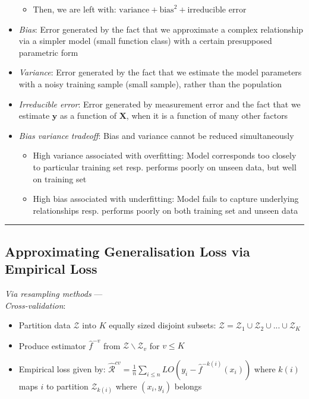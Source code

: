 \begin{itemize}
\begin{itemize}
\begin{itemize}
        \end{itemize}
        \item Then, we are left with: $\textrm{variance} + \textrm{bias}^2 + \textrm{irreducible error}$
    \end{itemize}
    \item \emph{Bias}: Error generated by the fact that we approximate a complex relationship via a simpler model (small function class) with a certain presupposed parametric form
    \item \emph{Variance}: Error generated by the fact that we estimate the model parameters with a noisy training sample (small sample), rather than the population
    \item \emph{Irreducible error}: Error generated by measurement error and the fact that we estimate $\boldsymbol{y}$ as a function of $\boldsymbol{X}$, when it is a function of many other factors
    \item \emph{Bias variance tradeoff}: Bias and variance cannot be reduced simultaneously
    \begin{itemize}
        \item High variance associated with overfitting: Model corresponds too closely to particular training set resp. performs poorly on unseen data, but well on training set 
        \item High bias associated with underfitting: Model fails to capture underlying relationships resp. performs poorly on both training set and unseen data
    \end{itemize}    
\end{itemize}

{\color{black}\hrule height 0.001mm}

\subsection*{Approximating Generalisation Loss via Empirical Loss}
\emph{Via resampling methods} --- \\
\emph{Cross-validation}:
\begin{itemize}
    \item Partition data $\mathcal{Z}$ into $K$ equally sized disjoint subsets: $\mathcal{Z} = \mathcal{Z}_1 \cup \mathcal{Z}_2 \cup ... \cup \mathcal{Z}_K$
    \item Produce estimator $\hat{f}^{-v}$ from $\mathcal{Z} \backslash \mathcal{Z}_v$ for $v \leq K$
    \item Empirical loss given by: $\hat{\mathcal{R}}^{cv} = \frac{1}{n} \sum_{i\leq n} LO(y_i - \hat{f}^{-k(i)} (x_i))$ where $k(i)$ maps $i$ to partition $\mathcal{Z}_{k(i)}$ where $(x_i,y_i)$ belongs
\end{itemize}

